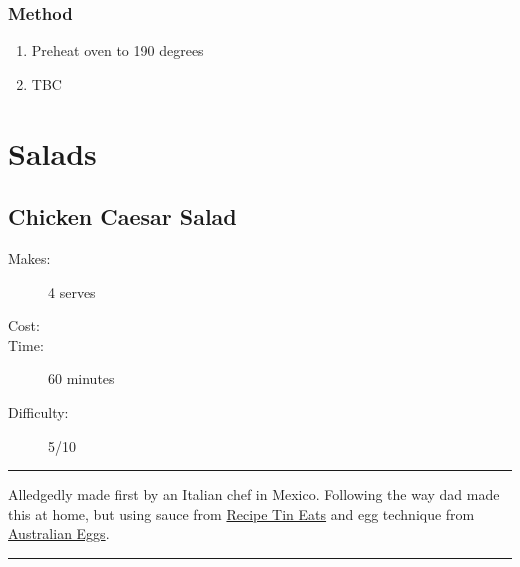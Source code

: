 \documentclass[]{article}
\begin{document}
\subsubsection*{\Large Method}
\begin{enumerate}[font=\huge\color{accent}]
	\item Preheat oven to 190 degrees
	\item TBC
\end{enumerate}
\newpage
{}
\section*{\center\Huge\color{accent}Salads}
\label{cat:Salads}
\label{rec:Chicken Caesar Salad}
\subsection*{\center\huge Chicken Caesar Salad}
\begin{description}
\item[Makes:] 4 serves
\item[Cost:] \textdollar
\item[Time:] 60 minutes
\item[Difficulty:] 5/10
\end{description}
\vspace{0.2cm}\hrule\vspace{0.5cm}
\begin{adjustwidth}{0.5 cm}{0.5 cm}

Alledgedly made first by an Italian chef in Mexico. Following the way dad made this at home, but using sauce from \href{https://www.recipetineats.com/chicken-caesar-salad/}{Recipe Tin Eats} and egg technique from \href{https://www.australianeggs.org.au/recipes-and-cooking/easy-boiled-eggs}{Australian Eggs}. \hfill{}\color{black}

\end{adjustwidth}
\vspace{0.5cm}\hrule
\end{document}
